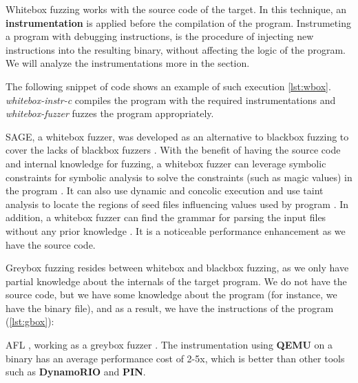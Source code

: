 \vspace{1.5\baselineskip}

Whitebox fuzzing works with the source code of the target. In this technique, an \textbf{instrumentation} is applied before the compilation of the program. Instrumeting a program with debugging instructions, is the procedure of injecting new instructions into the resulting binary, without affecting the logic of the program. We will analyze the instrumentations more in the  section.

The following snippet of code shows an example of such execution \ref{lst:wbox}. \textit{whitebox-instr-c} compiles the program with the required instrumentations and \textit{whitebox-fuzzer} fuzzes the program appropriately.



SAGE, a whitebox fuzzer, was developed as an alternative to blackbox fuzzing to cover the lacks of blackbox fuzzers \cite{godefroid2012sage}. With the benefit of having the source code and internal knowledge for fuzzing, a whitebox fuzzer can leverage symbolic constraints for symbolic analysis to solve the constraints (such as magic values) in the program \cite{cadar2011symbolic}. It can also use dynamic and concolic execution \cite{stephens2016driller} and use taint analysis to locate the regions of seed files influencing values used by program \cite{ganesh2009taint}. In addition, a whitebox fuzzer can find the grammar for parsing the input files without any prior knowledge \cite{godefroid2008grammar}. It is a noticeable performance enhancement as we have the source code.

\vspace{1.5\baselineskip}

Greybox fuzzing resides between whitebox and blackbox fuzzing, as we only have partial knowledge about the internals of the target program. We do not have the source code, but we have some knowledge about the program (for instance, we have the binary file), and as a result, we have the instructions of the program (\ref{lst:gbox}):



AFL , working as a greybox fuzzer \cite{afl_qemu}. The instrumentation using \textbf{QEMU} on a binary has an average performance cost of 2-5x, which is better than other tools such as \textbf{DynamoRIO} and \textbf{PIN}.

